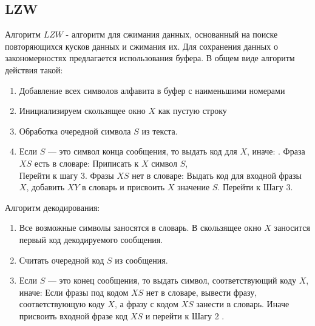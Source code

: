 \subsection{LZW}
Алгоритм $LZW$ - алгоритм для сжимания данных, основанный на поиске повторяющихся кусков данных и сжимания их. Для сохранения данных о закономерностях предлагается использования буфера. В общем виде алгоритм действия такой:
\begin{enumerate}
    \item Добавление всех символов алфавита в буфер с наименьшими номерами
    \item Инициализируем скользящее окно $X$ как пустую строку
    \item Обработка очередной символа $S$ из текста.
    \item Если $S$ — это символ конца сообщения, то выдать код для $X$, иначе:
    . Фраза $XS$ есть в словаре:
    Приписать к $X$ символ $S$, \\Перейти к шагу 3.
     Фразы $XS$ нет в словаре:
    Выдать код для входной фразы $X$, добавить $XY$ в словарь и присвоить $X$ значение $S$. Перейти к Шагу 3. 
\end{enumerate}

Алгоритм декодирования:
\begin{enumerate}
    \item Все возможные символы заносятся в словарь. В скользящее окно $X$
    заносится первый код декодируемого сообщения.
    \item  Считать очередной код $S$ из сообщения.
    \item Если $S$ — это конец сообщения, то выдать символ, соответствующий коду $X$, иначе:
     Если фразы под кодом $XS$ нет в словаре, вывести фразу, соответствующую коду $X$, а фразу с кодом $XS$
    занести в словарь.
     Иначе присвоить входной фразе код $XS$ и перейти к Шагу 2 .
\end{enumerate}
